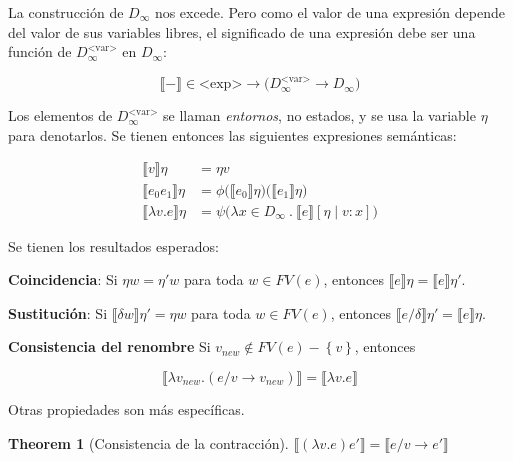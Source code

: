 \documentclass[article, 12pt]{article}
\newtheorem{theorem}{Theorem}
\newtheorem{theorem}{Theorem}
\begin{document}
La construcción de $D_\infty$ nos excede. Pero como el valor de una expresión
depende del valor de sus variables libres, el significado de una expresión debe
ser una función de $D_\infty^{\text{<var>}}$ en $D_\infty$:

\begin{equation*}
  \llbracket - \rrbracket \in \text{<exp>} \to \big( D_\infty^{\text{<var>}} \to
  D_\infty \big)
\end{equation*}

Los elementos de $D_\infty^{\text{<var>}}$ se llaman \textit{entornos}, no
estados, y se usa la variable $\eta$ para denotarlos. Se tienen entonces las
siguientes expresiones semánticas:

\begin{align*}
  \llbracket v \rrbracket \eta &= \eta v \\ 
  \llbracket e_0 e_1 \rrbracket\eta &= \phi\big( \llbracket e_0 \rrbracket\eta \big)
  \big( \llbracket e_1 \rrbracket\eta \big) \\ 
  \llbracket \lambda v. e \rrbracket\eta &= \psi \big( \lambda x \in D_{\infty}
  ~.~ \llbracket e \rrbracket[\eta \mid v : x] \big)
\end{align*}

Se tienen los resultados esperados:

\textbf{Coincidencia}: Si $\eta w = \eta' w$ para toda $w \in FV(e)$, entonces 
$\llbracket e \rrbracket\eta = \llbracket e \rrbracket\eta'$.

\textbf{Sustitución}: Si $\llbracket \delta w \rrbracket \eta' = \eta w$ para
toda $w \in FV(e)$, entonces $\llbracket e / \delta \rrbracket\eta ' =
\llbracket e \rrbracket \eta$. 

\textbf{Consistencia del renombre} Si $v_{new} \not\in FV(e) - \left\{ v
\right\} $,
 entonces 

 \begin{equation*}
   \llbracket \lambda v_{new} . (e / v \to v_{new}) \rrbracket = \llbracket
   \lambda v.e \rrbracket
 \end{equation*}

Otras propiedades son más específicas. 

\begin{theorem}[Consistencia de la contracción]
  $\llbracket (\lambda v.e)e' \rrbracket = \llbracket e / v \to e' \rrbracket$
\end{theorem}
\end{document}

